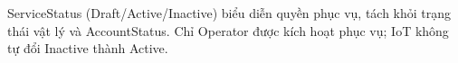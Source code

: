 ServiceStatus (Draft/Active/Inactive) biểu diễn quyền phục vụ, tách khỏi trạng thái vật lý và AccountStatus. Chỉ Operator được kích hoạt phục vụ; IoT không tự đổi Inactive thành Active.
